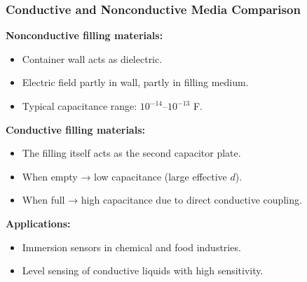 \begin{frame}
	\frametitle{Conductive and Nonconductive Media Comparison}
    \small
    \textbf{Nonconductive filling materials:}
    \begin{itemize}
        \item Container wall acts as dielectric.
        \item Electric field partly in wall, partly in filling medium.
        \item Typical capacitance range: $10^{-14}$–$10^{-13}$ F.
    \end{itemize}
    \textbf{Conductive filling materials:}
    \begin{itemize}
        \item The filling itself acts as the second capacitor plate.
        \item When empty → low capacitance (large effective $d$).
        \item When full → high capacitance due to direct conductive coupling.
    \end{itemize}
    \textbf{Applications:}
    \begin{itemize}
        \item Immersion sensors in chemical and food industries.
        \item Level sensing of conductive liquids with high sensitivity.
    \end{itemize}
\end{frame}
